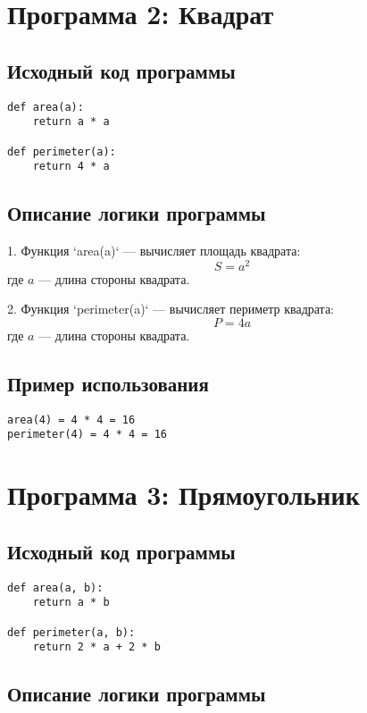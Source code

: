\documentclass{article}
\begin{document}
\section{Программа 2: Квадрат}

\subsection{Исходный код программы}

\begin{verbatim}
def area(a):
    return a * a

def perimeter(a):
    return 4 * a
\end{verbatim}

\subsection{Описание логики программы}

1. Функция `area(a)` — вычисляет площадь квадрата:
   \[
   S = a^2
   \]
   где \( a \) — длина стороны квадрата.

2. Функция `perimeter(a)` — вычисляет периметр квадрата:
   \[
   P = 4a
   \]
   где \( a \) — длина стороны квадрата.

\subsection{Пример использования}

\begin{verbatim}
area(4) = 4 * 4 = 16
perimeter(4) = 4 * 4 = 16
\end{verbatim}

\section{Программа 3: Прямоугольник}
\subsection{Исходный код программы}

\begin{verbatim}
def area(a, b):
    return a * b

def perimeter(a, b):
    return 2 * a + 2 * b
\end{verbatim}

\subsection{Описание логики программы}
\end{document}
